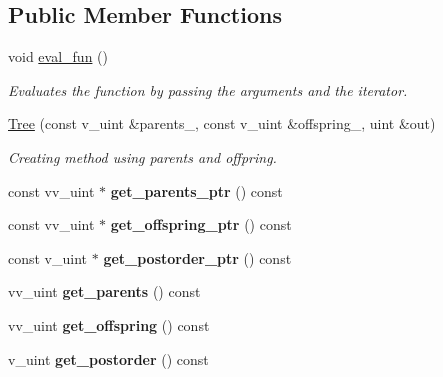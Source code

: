 \subsection*{Public Member Functions}
\begin{DoxyCompactItemize}
\item 
\mbox{\label{classTree_a5a24565d179a3bd6edae1ff323060a93}} 
void \hyperlink{classTree_a5a24565d179a3bd6edae1ff323060a93}{eval\+\_\+fun} ()
\begin{DoxyCompactList}\small\item\em Evaluates the function by passing the arguments and the iterator. \end{DoxyCompactList}\item 
\hyperlink{classTree_a0f964d9ba9834822d3e18946a5361839}{Tree} (const v\+\_\+uint \&parents\+\_\+, const v\+\_\+uint \&offspring\+\_\+, uint \&out)
\begin{DoxyCompactList}\small\item\em Creating method using parents and offpring. \end{DoxyCompactList}\item 
\mbox{\label{classTree_a41116e321adcec99b0e73aea766d0ce0}} 
const vv\+\_\+uint $\ast$ {\bfseries get\+\_\+parents\+\_\+ptr} () const
\item 
\mbox{\label{classTree_ad52da0d981e7fb93c933d60382bfb07d}} 
const vv\+\_\+uint $\ast$ {\bfseries get\+\_\+offspring\+\_\+ptr} () const
\item 
\mbox{\label{classTree_a3c2193b841c5828d6654bcc7b6fa41f6}} 
const v\+\_\+uint $\ast$ {\bfseries get\+\_\+postorder\+\_\+ptr} () const
\item 
\mbox{\label{classTree_a9ab87e5d50bbf66107952b70454224da}} 
vv\+\_\+uint {\bfseries get\+\_\+parents} () const
\item 
\mbox{\label{classTree_a1147fa8eaf7f141894ffe5aaad220fd1}} 
vv\+\_\+uint {\bfseries get\+\_\+offspring} () const
\item 
\mbox{\label{classTree_a544d422169d7c4e33cd61e741f995741}} 
v\+\_\+uint {\bfseries get\+\_\+postorder} () const
\item 
\mbox{\label{classTree_a525fcc5556afc09006966186ee6c072a}} 

\end{DoxyCompactItemize}
